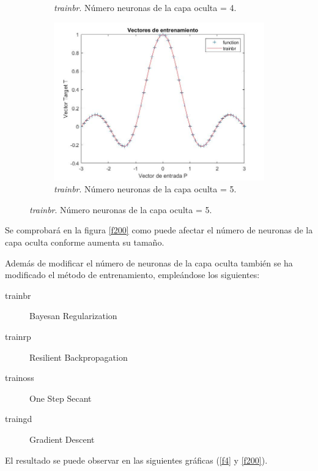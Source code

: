 \documentclass{article}
\begin{document}
\begin{figure}[H]
\begin{subfigure}{0.3\textwidth}
  \caption{\textit{trainbr}. Número neuronas de la capa oculta = 4.}
 \end{subfigure}
 \begin{subfigure}{0.3\textwidth}
  \includegraphics[width=0.8\linewidth]{../images/I_ex2_trainbr_5.jpg}
  \caption{\textit{trainbr}. Número neuronas de la capa oculta = 5.}
 \end{subfigure}
\end{figure}

Se comprobará en la figura \hyperref[f200]{\ref{f200}} como puede afectar el
número de neuronas de la capa oculta conforme aumenta su tamaño.

Además de modificar el número de neuronas de la capa oculta también se ha
modificado el método de entrenamiento, empleándose los siguientes:

\begin{description}
 \item [trainbr] Bayesan Regularization
 \item [trainrp] Resilient Backpropagation
 \item [trainoss] One Step Secant
 \item [traingd] Gradient Descent
\end{description}

El resultado se puede observar en las siguientes gráficas
(\hyperref[f4]{\ref{f4}} y \hyperref[f200]{\ref{f200}}).
\end{document}
